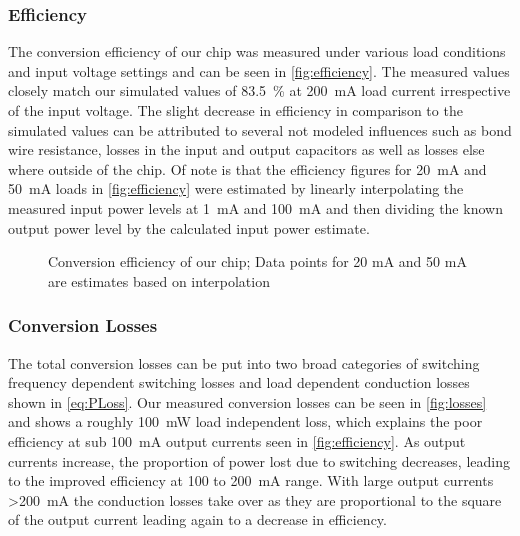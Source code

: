 \subsubsection{Efficiency}
\label{sec:efficiency}

The conversion efficiency of our chip was measured under various load conditions and input voltage settings and can be seen in \autoref{fig:efficiency}. The measured values closely match our simulated values of \qty{83.5}{\percent} at \qty{200}{\milli\ampere} load current irrespective of the input voltage. The slight decrease in efficiency in comparison to the simulated values can be attributed to several not modeled influences such as bond wire resistance, losses in the input and output capacitors as well as losses else where outside of the chip. Of note is that the efficiency figures for \qty{20}{\milli\ampere} and \qty{50}{\milli\ampere} loads in \autoref{fig:efficiency} were estimated by linearly interpolating the measured input power levels at \qty{1}{\milli\ampere} and \qty{100}{\milli\ampere} and then dividing the known output power level by the calculated input power estimate.
\begin{figure}[h]
    \centering
    
    \caption{Conversion efficiency of our chip; Data points for 20 mA and 50 mA are estimates based on interpolation}
    \label{fig:efficiency}
\end{figure}
\clearpage
\subsubsection{Conversion Losses}
\label{sec:losses}
The total conversion losses can be put into two broad categories of switching frequency dependent switching losses and load dependent conduction losses shown in \autoref{eq:PLoss}. Our measured conversion losses can be seen in \autoref{fig:losses} and shows a roughly \qty{100}{\milli\watt} load independent loss, which explains the poor efficiency at sub \qty{100}{\milli\ampere} output currents seen in \autoref{fig:efficiency}. As output currents increase, the proportion of power lost due to switching decreases, leading to the improved efficiency at 100 to \qty{200}{\milli\ampere} range. With large output currents >\qty{200}{\milli\ampere} the conduction losses take over as they are proportional to the square of the output current leading again to a decrease in efficiency.


